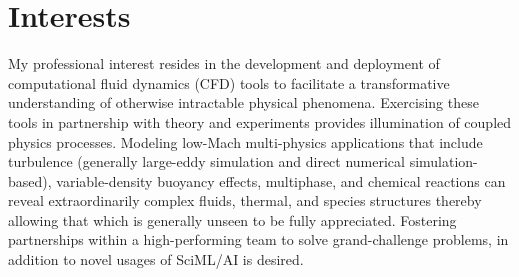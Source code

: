 \documentclass[letterpaper]{twentysecondcv_spd} %
\begin{document}
\pagestyle{headings}
\setcounter{page}{1}



\makeprofile %

\section{Interests}

My professional interest resides in the development and deployment of computational fluid dynamics (CFD) tools to facilitate a transformative understanding of otherwise intractable physical phenomena. Exercising these tools in partnership with theory and experiments provides illumination of coupled physics processes. Modeling low-Mach multi-physics applications that include turbulence (generally large-eddy simulation and direct numerical simulation-based), variable-density buoyancy effects, multiphase, and chemical reactions can reveal extraordinarily complex fluids, thermal, and species structures thereby allowing that which is generally unseen to be fully appreciated. Fostering partnerships within a high-performing team to solve grand-challenge problems, in addition to novel usages of SciML/AI is desired.

\end{document}
